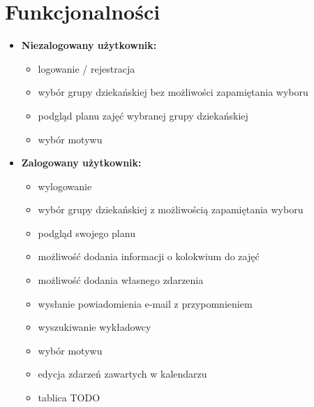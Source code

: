 \documentclass[a4paper,11pt]{uzreport}
\begin{document}
\section{Funkcjonalności}
    \begin{itemize}[leftmargin=0.50in]
    
     \item \textbf{Niezalogowany użytkownik:}
            \begin{itemize}[leftmargin=0.25in]
            
                \item logowanie / rejestracja

                \item wybór grupy dziekańskiej bez możliwości zapamiętania wyboru
                
                \item podgląd planu zajęć wybranej grupy dziekańskiej
                
                \item wybór motywu
                
            \end{itemize}

     \item \textbf{Zalogowany użytkownik:}
            \begin{itemize}[leftmargin=0.25in]
            
                \item wylogowanie

                \item wybór grupy dziekańskiej z możliwością zapamiętania wyboru
                
                \item podgląd swojego planu
                
                \item możliwość dodania informacji o kolokwium do zajęć
                
                \item możliwość dodania własnego zdarzenia
                
                \item wysłanie powiadomienia e-mail z przypomnieniem
                
                \item wyszukiwanie wykładowcy
                
                \item wybór motywu
                
                \item edycja zdarzeń zawartych w kalendarzu
                
                \item tablica TODO
     
            \end{itemize}
     
    \end{itemize}
    
\end{document}
